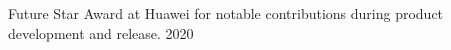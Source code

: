 
\begin{cvhonors}

  \cvhonor
    {Future Star Award} %
    {at Huawei for notable contributions during product development and release.} %
    {} %
    {2020} %

\end{cvhonors}